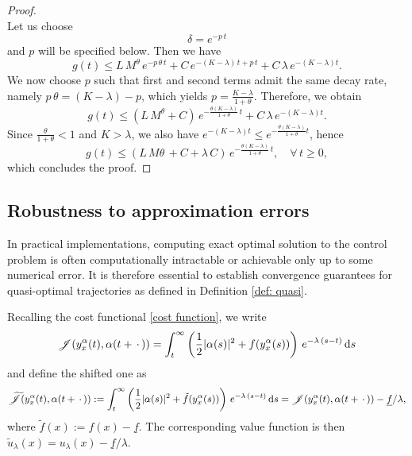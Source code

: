 \documentclass[12pt]{amsart}
\newcommand{\D}[1]{\mbox{\rm #1}}
\newcommand{\dd}{\D{d}}
\numberwithin{equation}{section}
\theoremstyle{plain}
\begin{document}
\begin{proof}
\begin{equation*}
\end{equation*}
Let us choose 
\begin{equation*}
    \delta = e^{-p\,t}
\end{equation*}
and $p$ will be specified below. Then we have
\begin{equation*}
    g(t)\leq L\,M^{\theta}\,e^{-p\,\theta\,t}+ C\, e^{-(K-\lambda)\,t +p \,t}+C\,\lambda\, e^{-(K-\lambda)t}.
\end{equation*}
We now choose $p$ such that first and second terms admit the same decay rate, namely $p\,\theta = (K-\lambda) - p$, which yields $p = \frac{K-\lambda}{1+\theta}$. Therefore, we obtain
\begin{equation*}
    g(t)\leq (L\,M^{\theta}+ C)\,e^{-\frac{\theta(K-\lambda)}{1+\theta}\,t}+C\,\lambda\, e^{-(K-\lambda)t}.
\end{equation*}
Since $\frac{\theta}{1+\theta}<1$ and $K>\lambda$, we also have $e^{-(K-\lambda)t} \leq e^{-\frac{\theta(K-\lambda)}{1+\theta}t}$, hence
\begin{equation*}
    g(t) \leq (L\,M{\theta}\, + C + \lambda\,C)\, e^{-\frac{\theta(K-\lambda)}{1+\theta}\,t}, \quad \forall\,t\geq0,
\end{equation*}
which concludes the proof.
\end{proof}

\subsection{Robustness to approximation errors}


In practical implementations, computing exact optimal solution to the control problem is often computationally intractable or achievable only up to some numerical error. It is therefore essential to establish convergence guarantees for quasi-optimal trajectories as defined in Definition \ref{def: quasi}.


Recalling the cost functional \eqref{cost function}, we write
\begin{equation*}
    \mathscr{J}(y_{x}^{\alpha}(t),\alpha(t+\,\cdot\,)) = \int_{t}^{\infty} \left( \frac{1}{2}|\alpha(s)|^{2} + f(y_{x}^{\alpha}(s)) \right)\,e^{-\lambda\,(s-t)}\,\dd s
\end{equation*}
and define the shifted one as
\begin{equation*}
    \widetilde{\mathscr{J}}(y_{x}^{\alpha}(t),\alpha(t+\,\cdot\,)) := \int_{t}^{\infty} \left( \frac{1}{2}|\alpha(s)|^{2} + \tilde{f}(y_{x}^{\alpha}(s)) \right)\,e^{-\lambda\,(s-t)}\,\dd s = \mathscr{J}(y_{x}^{\alpha}(t),\alpha(t+\,\cdot\,)) - \underline{f}/\lambda,
\end{equation*}
where $\tilde{f}(x) := f(x) - \underline{f}$. The corresponding value function is then $\tilde{u}_{\lambda}(x) = u_{\lambda}(x) - \underline{f}/\lambda$.
\end{document}
